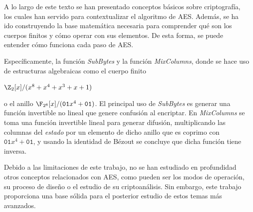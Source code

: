 A lo largo de este texto se han presentado conceptos básicos sobre criptografía, los cuales han servido para contextualizar el algoritmo de AES. Además, se ha ido construyendo la base matemática necesaria para comprender qué son los cuerpos finitos y cómo operar con sus elementos. De esta forma, se puede entender cómo funciona cada paso de AES. 

Específicamente, la función \textit{SubBytes} y la función \textit{MixColumns}, donde se hace uso de estructuras algebraicas como el cuerpo finito \begin{Revision}$\Z_2[x]/(x^8 + x^4 + x^3 + x + 1)$\end{Revision} o el anillo $\F_{2^8}[x]/(\texttt{01}x^4+\texttt{01})$. El principal uso de \textit{SubBytes} es generar una función invertible no lineal que genere confusión al encriptar. En \textit{MixColumns} se toma una función invertible lineal para generar difusión, multiplicando las columnas del \textit{estado} por un elemento de dicho anillo que es coprimo con $\texttt{01}x^4+\texttt{01}$, y usando la identidad de Bézout se concluye que dicha función tiene inversa.

Debido a las limitaciones de este trabajo, no se han estudiado en profundidad otros conceptos relacionados con AES, como pueden ser los modos de operación, su proceso de diseño o el estudio de su criptoanálisis. Sin embargo, este trabajo proporciona una base sólida para el posterior estudio de estos temas más avanzados.